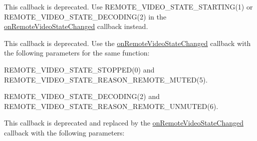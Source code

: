 \begin{DoxyRefList}
\item[Member \mbox{\hyperlink{classio_1_1agora_1_1rtc2_1_1_i_rtc_engine_event_handler_ab63e6aa894c685a766fc6e81711c68e6}{io.agora.rtc2.I\+Rtc\+Engine\+Event\+Handler.on\+First\+Remote\+Video\+Decoded}} (int uid, int width, int height, int elapsed)]\label{deprecated__deprecated000007}%
%
 This callback is deprecated. Use {\ttfamily R\+E\+M\+O\+T\+E\+\_\+\+V\+I\+D\+E\+O\+\_\+\+S\+T\+A\+T\+E\+\_\+\+S\+T\+A\+R\+T\+I\+N\+G(1)} or {\ttfamily R\+E\+M\+O\+T\+E\+\_\+\+V\+I\+D\+E\+O\+\_\+\+S\+T\+A\+T\+E\+\_\+\+D\+E\+C\+O\+D\+I\+N\+G(2)} in the \mbox{\hyperlink{classio_1_1agora_1_1rtc2_1_1_i_rtc_engine_event_handler_a5daae97f78becbf71dc3dbfd494f8419}{on\+Remote\+Video\+State\+Changed}} callback instead. 
\item[Member \mbox{\hyperlink{classio_1_1agora_1_1rtc2_1_1_i_rtc_engine_event_handler_a9b5ec64a801ee3442a0aeab35c5d059b}{io.agora.rtc2.I\+Rtc\+Engine\+Event\+Handler.on\+User\+Mute\+Video}} (int uid, boolean muted)]\label{deprecated__deprecated000008}%
%
 This callback is deprecated. Use the \mbox{\hyperlink{classio_1_1agora_1_1rtc2_1_1_i_rtc_engine_event_handler_a5daae97f78becbf71dc3dbfd494f8419}{on\+Remote\+Video\+State\+Changed}} callback with the following parameters for the same function\+:
\begin{DoxyItemize}
\item {\ttfamily R\+E\+M\+O\+T\+E\+\_\+\+V\+I\+D\+E\+O\+\_\+\+S\+T\+A\+T\+E\+\_\+\+S\+T\+O\+P\+P\+E\+D(0)} and {\ttfamily R\+E\+M\+O\+T\+E\+\_\+\+V\+I\+D\+E\+O\+\_\+\+S\+T\+A\+T\+E\+\_\+\+R\+E\+A\+S\+O\+N\+\_\+\+R\+E\+M\+O\+T\+E\+\_\+\+M\+U\+T\+E\+D(5)}.
\item {\ttfamily R\+E\+M\+O\+T\+E\+\_\+\+V\+I\+D\+E\+O\+\_\+\+S\+T\+A\+T\+E\+\_\+\+D\+E\+C\+O\+D\+I\+N\+G(2)} and {\ttfamily R\+E\+M\+O\+T\+E\+\_\+\+V\+I\+D\+E\+O\+\_\+\+S\+T\+A\+T\+E\+\_\+\+R\+E\+A\+S\+O\+N\+\_\+\+R\+E\+M\+O\+T\+E\+\_\+\+U\+N\+M\+U\+T\+E\+D(6)}. 
\end{DoxyItemize}
\item[Member \mbox{\hyperlink{classio_1_1agora_1_1rtc2_1_1_i_rtc_engine_event_handler_aebce7065ea48abbdb6001fec7a00c1ac}{io.agora.rtc2.I\+Rtc\+Engine\+Event\+Handler.on\+User\+Enable\+Video}} (int uid, boolean enabled)]\label{deprecated__deprecated000009}%
%
 This callback is deprecated and replaced by the \mbox{\hyperlink{classio_1_1agora_1_1rtc2_1_1_i_rtc_engine_event_handler_a5daae97f78becbf71dc3dbfd494f8419}{on\+Remote\+Video\+State\+Changed}} callback with the following parameters\+:

\end{DoxyRefList}
